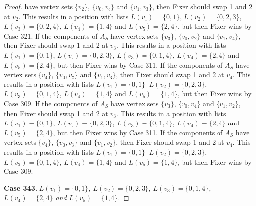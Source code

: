 \documentclass[12pt]{amsart}
\theoremstyle{plain}
\theoremstyle{definition}
\theoremstyle{remark}
\begin{document}
\begin{proof}
have vertex sets $\{v_2\}$, $\{v_0, v_4\}$ and $\{v_1, v_3\}$, then Fixer should swap 1 and 2 at $v_2$. This results in a position with lists $L(v_1) = \{0, 1\}$, $L(v_2) = \{0, 2, 3\}$, $L(v_3) = \{0, 2, 4\}$, $L(v_4) = \{1, 4\}$ and $L(v_5) = \{2, 4\}$, but then Fixer wins by Case 321. If the components of $A_S$ have vertex sets $\{v_3\}$, $\{v_0, v_2\}$ and $\{v_1, v_4\}$, then Fixer should swap 1 and 2 at $v_3$. This results in a position with lists $L(v_1) = \{0, 1\}$, $L(v_2) = \{0, 2, 3\}$, $L(v_3) = \{0, 1, 4\}$, $L(v_4) = \{2, 4\}$ and $L(v_5) = \{2, 4\}$, but then Fixer wins by Case 311. If the components of $A_S$ have vertex sets $\{v_4\}$, $\{v_0, v_2\}$ and $\{v_1, v_3\}$, then Fixer should swap 1 and 2 at $v_4$. This results in a position with lists $L(v_1) = \{0, 1\}$, $L(v_2) = \{0, 2, 3\}$, $L(v_3) = \{0, 1, 4\}$, $L(v_4) = \{1, 4\}$ and $L(v_5) = \{1, 4\}$, but then Fixer wins by Case 309. If the components of $A_S$ have vertex sets $\{v_3\}$, $\{v_0, v_4\}$ and $\{v_1, v_2\}$, then Fixer should swap 1 and 2 at $v_3$. This results in a position with lists $L(v_1) = \{0, 1\}$, $L(v_2) = \{0, 2, 3\}$, $L(v_3) = \{0, 1, 4\}$, $L(v_4) = \{2, 4\}$ and $L(v_5) = \{2, 4\}$, but then Fixer wins by Case 311. If the components of $A_S$ have vertex sets $\{v_4\}$, $\{v_0, v_3\}$ and $\{v_1, v_2\}$, then Fixer should swap 1 and 2 at $v_4$. This results in a position with lists $L(v_1) = \{0, 1\}$, $L(v_2) = \{0, 2, 3\}$, $L(v_3) = \{0, 1, 4\}$, $L(v_4) = \{1, 4\}$ and $L(v_5) = \{1, 4\}$, but then Fixer wins by Case 309. 

\noindent\textbf{Case 343.  }\textit{$L(v_1) = \{0, 1\}$, $L(v_2) = \{0, 2, 3\}$, $L(v_3) = \{0, 1, 4\}$, $L(v_4) = \{2, 4\}$ and $L(v_5) = \{1, 4\}$.}


\end{proof}
\end{document}
